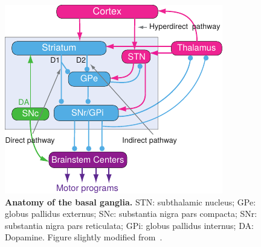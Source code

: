 \begin{figure}[bth]
  \begin{center}
    \includegraphics[width=0.9\linewidth]{ch-intro/figures/BGAnatomy}
    \caption[Anatomy of the basal ganglia]
    {\textbf{Anatomy of the basal ganglia.}
    STN: subthalamic nucleus;
    GPe: globus pallidus externus;
    SNc: substantia nigra pars compacta;
    SNr: substantia nigra pars reticulata;
    GPi: globus pallidus internus;
    DA: Dopamine.
    Figure slightly modified from~\cite{Grillner2016BG}.
    }
    \label{fig:intro:BGAnatomy}
  \end{center}
\end{figure}